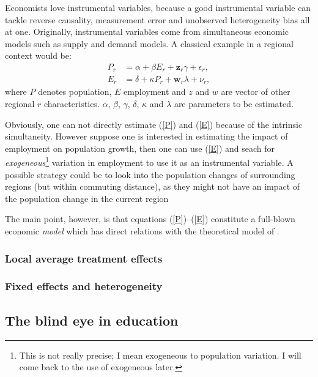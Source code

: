 \documentclass[fleqn,10pt]{SelfArx} %
\begin{document}
Economists love instrumental variables, because a good instrumental variable can
tackle reverse causality, measurement error and unobserved heterogeneity bias
all at one. Originally, instrumental variables come from simultaneous economic
models such as supply and demand models. A classical example in a regional
context would be:
\begin{align}
  P_r &=  \alpha + \beta E_r + \mathbf{z}_r\gamma + \epsilon_r, \label{P}\\
  E_r &=  \delta + \kappa P_r+ \mathbf{w}_r\lambda + \nu_r,\label{E}
\end{align}
where $P$ denotes population, $E$ employment and $z$ and $w$ are vector of other
regional $r$ characteristics. $\alpha$, $\beta$, $\gamma$, $\delta$, $\kappa$
and $\lambda$ are parameters to be estimated.

Obviously, one can not directly estimate (\ref{P}) and (\ref{E}) because of the
intrinsic simultaneity. However suppose one is interested in estimating the
impact of employment on population growth, then one can use (\ref{E}) and seach
for \emph{exogeneous}\footnote{This is not really precise; I mean exogeneous to
  population variation. I will come back to the use of exogeneous later.} variation in employment to use it as an instrumental
variable. A possible strategy could be to look into the population changes of
surrounding regions (but within commuting distance), as they might not have an
impact of the population change in the current region
\citep[see][]{DeGraaff2012, Graaff2012}

The main point, however, is that equations (\ref{P})--(\ref{E}) constitute a full-blown
economic \emph{model} which has direct relations with the theoretical model of \citet{roback1982wages}. 

\subsubsection{Local average treatment effects}

\subsubsection{Fixed effects and heterogeneity}

\subsection{The blind eye in education}

\end{document}
